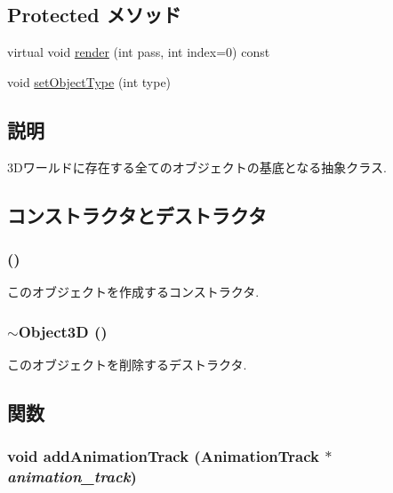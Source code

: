\subsection*{Protected メソッド}
\begin{CompactItemize}
\item 
virtual void \hyperlink{classm3g_1_1Object3D_1efcb1973989d9963d5bd6d03065d389}{render} (int pass, int index=0) const 
\item 
void \hyperlink{classm3g_1_1Object3D_777701a101d1332abffa2ad6a255b91d}{setObjectType} (int type)
\end{CompactItemize}


\subsection{説明}
3Dワールドに存在する全てのオブジェクトの基底となる抽象クラス. 

\subsection{コンストラクタとデストラクタ}
\hypertarget{classm3g_1_1Object3D_f4b10c33b9014a3f0a675ef4b699b773}{
\subsubsection[{Object3D}]{ ()}}
\label{classm3g_1_1Object3D_f4b10c33b9014a3f0a675ef4b699b773}


このオブジェクトを作成するコンストラクタ. \hypertarget{classm3g_1_1Object3D_8ece10725587e63a2c75283c16cc4df5}{
\subsubsection[{$\sim$Object3D}]{\setlength{\rightskip}{0pt plus 5cm}$\sim${\bf Object3D} ()}}
\label{classm3g_1_1Object3D_8ece10725587e63a2c75283c16cc4df5}


このオブジェクトを削除するデストラクタ. 

\subsection{関数}
\hypertarget{classm3g_1_1Object3D_415c0b110f95410ded9b85e5d99a496b}{
\subsubsection[{addAnimationTrack}]{\setlength{\rightskip}{0pt plus 5cm}void addAnimationTrack ({\bf AnimationTrack} $\ast$ {\em animation\_\-track})}}
\label{classm3g_1_1Object3D_415c0b110f95410ded9b85e5d99a496b}


